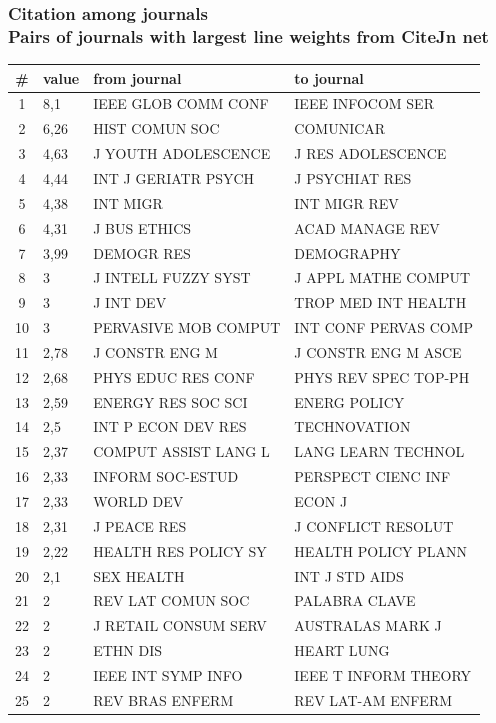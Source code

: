 \documentclass[hyperref={pdfstartview={FitBH -32768},
                         pdfpagemode=FullScreen,
                         plainpages=false,
                         colorlinks=true}
              ]{beamer}
\begin{document}
\begin{frame}[fragile]
\frametitle{Citation among journals\\ \normalsize Pairs of journals with largest line weights from CiteJn net}

\renewcommand{\arraystretch}{0.83}
\tiny
\begin{center}
\begin{tabular}{c|l|p{3cm}|p{3cm}}
\# &	value &	from journal  &	to journal \\  \hline 
1&	8,1&	IEEE GLOB COMM CONF&	IEEE INFOCOM SER\\
2&	6,26&	HIST COMUN SOC&	COMUNICAR\\
3&	4,63&	J YOUTH ADOLESCENCE&	J RES ADOLESCENCE\\
4&	4,44&	INT J GERIATR PSYCH&	J PSYCHIAT RES\\
5&	4,38&	INT MIGR&	INT MIGR REV\\
6&	4,31&	J BUS ETHICS&	ACAD MANAGE REV\\
7&	3,99&	DEMOGR RES&	DEMOGRAPHY\\
8&	3&	J INTELL FUZZY SYST&	J APPL MATHE COMPUT\\
9&	3&	J INT DEV&	TROP MED INT HEALTH\\
10&	3&	PERVASIVE MOB COMPUT&	INT CONF PERVAS COMP\\
11&	2,78&	J CONSTR ENG M&	J CONSTR ENG M ASCE\\
12&	2,68&	PHYS EDUC RES CONF&	PHYS REV SPEC TOP-PH\\
13&	2,59&	ENERGY RES SOC SCI&	ENERG POLICY\\
14&	2,5&	INT P ECON DEV RES&	TECHNOVATION\\
15&	2,37&	COMPUT ASSIST LANG L&	LANG LEARN TECHNOL\\
16&	2,33&	INFORM SOC-ESTUD&	PERSPECT CIENC INF\\
17&	2,33&	WORLD DEV&	ECON J\\
18&	2,31&	J PEACE RES&	J CONFLICT RESOLUT\\
19&	2,22&	HEALTH RES POLICY SY&	HEALTH POLICY PLANN\\
20&	2,1&	SEX HEALTH&	INT J STD AIDS\\
21&	2&	REV LAT COMUN SOC&	PALABRA CLAVE\\
22&	2&	J RETAIL CONSUM SERV&	AUSTRALAS MARK J\\
23&	2&	ETHN DIS&	HEART LUNG\\
24&	2&	IEEE INT SYMP INFO&	IEEE T INFORM THEORY\\
25&	2&	REV BRAS ENFERM&	REV LAT-AM ENFERM\\ \hline 
\end{tabular}
\end{center}

\end{frame}
\end{document}
